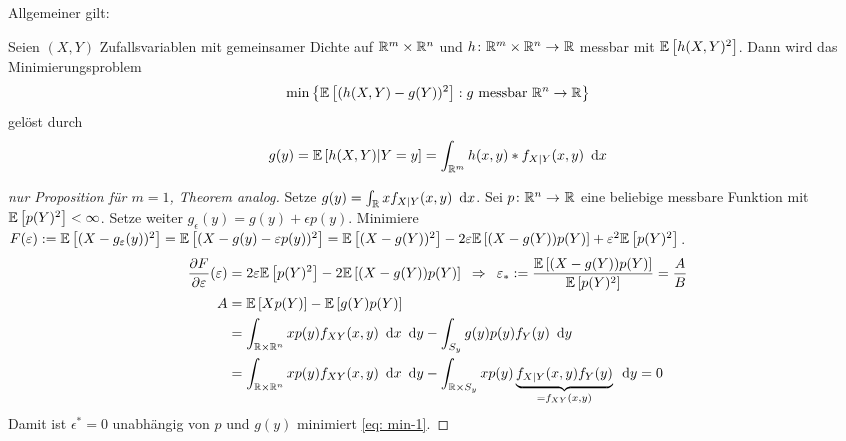 Allgemeiner gilt:

\begin{theorem} %
	Seien $(X,Y)$ Zufallsvariablen mit gemeinsamer Dichte auf $\mathbb{R}^m \times \mathbb{R}^n$ und $\abb{h}{\R^m \times \Rn}{\R}$ messbar mit $\mathbb{E} \left[ h(X,Y)^2 \right]$. Dann wird das Minimierungsproblem
	\begin{equation*}
	\min\left\{ \mathbb{E} \left[ (h(X,Y)-g(Y))^2 \right] : g \text{ messbar } \mathbb{R}^n \to \mathbb{R} \right\}
	\end{equation*}
	gelöst durch
	\begin{equation*}
	g(y) = \mathbb{E} \left[ h(X,Y) | Y = y \right] = \int_{\mathbb{R}^m} h(x,y) * f_{X|Y}(x,y) \enskip \mathrm{d}x
	\end{equation*}
\end{theorem}

\begin{proof}[nur Proposition für $m=1$, Theorem analog]
	Setze $g(y) = \int_{\mathbb{R}} x f_{X|Y}(x,y) \enskip \mathrm{d}x$. Sei $\abb{p}{\Rn}{\R}$ eine beliebige messbare Funktion mit $\mathbb{E} \left[ p(Y)^2 \right]< \infty$. Setze weiter $g_\epsilon(y) = g(y) + \epsilon p(y)$. Minimiere $F(\varepsilon) \mathrel{:=} \mathbb{E} \left[ (X-g_\varepsilon(y))^2 \right] = \mathbb{E} \left[ (X - g(y) - \varepsilon p(y))^2 \right] = \mathbb{E} \left[ (X-g(Y))^2 \right] - 2\varepsilon \mathbb{E} \left[ (X-g(Y)) p(Y) \right] + \varepsilon^2 \mathbb{E} \left[ p(Y)^2 \right]$.
	\begin{equation*}
	\begin{aligned}
	\frac{\partial F}{\partial \varepsilon}(\varepsilon) &= 2\varepsilon \mathbb{E} \left[ p(Y)^2 \right] - 2\mathbb{E} \left[ (X-g(Y)) p(Y) \right]  \enskip \Rightarrow \enskip \varepsilon_\ast \mathrel{:=}\frac{\mathbb{E} \left[ (X-g(Y))p(Y) \right]}{\mathbb{E} \left[ p(Y)^2 \right]} = \frac{A}{B} \\
	A &= \mathbb{E} \left[ Xp(Y) \right] - \mathbb{E} \left[ g(Y) p(Y) \right]  \\
	&= \int_{\mathbb{R} \times \mathbb{R}^n} x p(y) f_{XY}(x,y) \enskip \mathrm{d}x \enskip \mathrm{d}y - \int_{S_y} g(y) p(y) f_Y(y) \enskip \mathrm{d}y \\
	&= \int_{\mathbb{R} \times \mathbb{R}^n} x p(y) f_{XY}(x,y) \enskip \mathrm{d}x \enskip \mathrm{d}y - \int_{\mathbb{R} \times S_y} x p(y) \underbrace{f_{X|Y}(x,y) f_Y(y)}_{=f_{XY}(x,y)} \enskip \mathrm{d}y = 0
	\end{aligned}
	\end{equation*}
	Damit ist $\epsilon^\ast = 0$ unabhängig von $p$ und $g(y)$ minimiert \eqref{eq: min-1}.
\end{proof}

